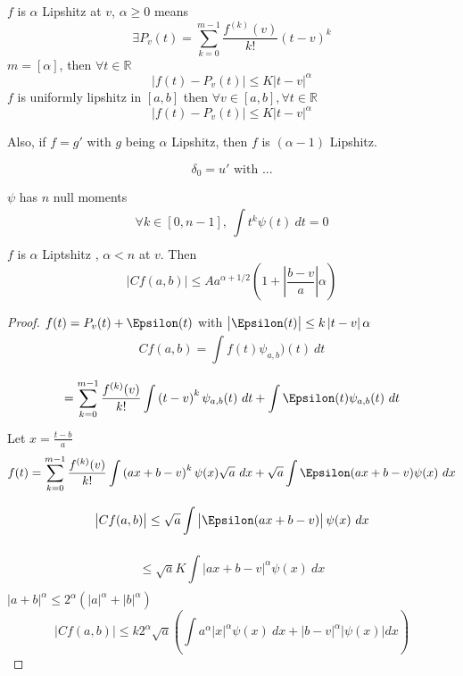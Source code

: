 \begin{defn}
    $ f $ is $ \alpha  $ Lipshitz at $ v  $, $ \alpha \geq 0  $ means 
    \[
        \exists P_v(t) = \sum_{k=0}^{m-1} \frac{ f _{  }^{ (k) } (v)  }{ k!  } \left( t-v
        \right) ^k 
    \] $ m = [\alpha]  $, then $ \forall t \in \mathbb{R} $ 
    \[
        \left | f(t) - P_v(t)  \right | \leq K \left | t-v  \right | ^{\alpha} 
    \]
    $ f $ is uniformly lipshitz in $ [a,b]  $ then $ \forall v \in [a,b] , \forall t \in \mathbb{R} $
    \[
        \left | f(t) - P_v(t)  \right | \leq K \left | t-v  \right | ^{\alpha} 
    \]
    \label{def:Lipshitz function}
\end{defn}

Also, if $ f = g'  $ with $ g $ being $ \alpha  $ Lipshitz, then $ f $ is $ \left( \alpha
-1 \right)  $ Lipshitz. 

\begin{exmp}[]
    \[
    \delta_0 = u' \text{ with ...} 
    \]
\end{exmp}



\begin{ftheo}[]
    $ \psi  $ has $ n  $ null moments 
    \[
        \forall k \in [0, n-1] , \ \int\limits_{ }^{ } t^k \psi(t) \ dt = 0
    \]
    $ f $ is $ \alpha  $ Liptshitz , $ \alpha < n  $ at $ v  $. 
    Then 
    \[
        \left | Cf(a,b)  \right | \leq Aa^{\alpha + 1/2 } \left( 1 + \left | \frac{ b-v
        }{ a }  \right | \alpha \right) 
    \]
    \label{th:}
\end{ftheo} 


\begin{proof}
    $ f(t) = P_v(t) + \Epsilon (t)  $ with $ \left | \Epsilon (t)  \right | \leq k \left |
    t-v \right |\alpha   $
    \[
        Cf(a,b) = \int\limits_{ }^{ } f(t) \psi_{a,b} )(t) \ dt 
    \]
    \[
        = \sum_{k=0}^{m-1} \frac{ f^{(k)} (v)  }{ k!  } \int\limits_{ }^{ } \left( t-v
        \right) ^k \psi_{a,b} (t) \ dt + \int\limits_{ }^{ } \Epsilon(t) \psi_{a,b} (t) \
        dt 
    \]
    Let $ x = \frac{ t-b }{ a }  $
    \[
        f(t) = \sum_{k=0}^{m-1} \frac{ f^{(k)}(v)  }{ k!  } \int\limits_{}^{ } \left( ax +
        b - v \right) ^k \psi(x) \sqrt{a} \ dx + \sqrt{a} \int\limits_{ }^{ } \Epsilon(ax
        + b - v) \psi(x) \ dx
    \]
    \[
        \left | Cf(a,b)  \right | \leq \sqrt{a} \int\limits_{ }^{ } \left | \Epsilon(ax +
        b - v) \right | \psi(x) \ dx 
    \]
    \[
        \leq \sqrt{a} K \int\limits_{ }^{ } \left | ax + b - v  \right | ^{\alpha} \psi(x)
        \ dx 
    \]
    $ \left | a+b \right | ^{\alpha}  \leq 2^{\alpha} \left( \left | a \right|^{\alpha} +
    \left | b \right | ^{\alpha} \right) $
    \[
        \left | Cf(a,b)  \right | \leq k2^{\alpha} \sqrt{a} \left( \int\limits_{ }^{ } a
        _{  }^{ \alpha  } \left | x \right | _{  }^{ \alpha  } \psi(x) \ dx + \left | b -
    v \right | _{  }^{ \alpha  } \left |\psi(x) \right | dx \right) 
    \]

\end{proof}


